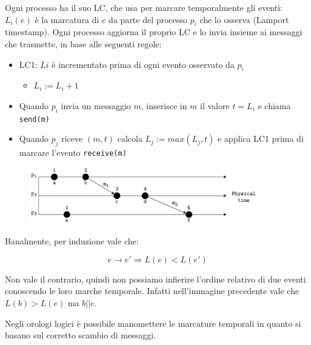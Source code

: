 Ogni processo ha il suo LC, che usa per marcare temporalmente gli eventi: $L_{i}(e)$ è la marcatura di $e$ da parte del processo $p_{i}$ che lo osserva (Lamport timestamp). Ogni processo aggiorna il proprio LC e lo invia insieme ai messaggi che trasmette, in base alle seguenti regole:
\begin{itemize}
    \item LC1: $L{i}$ è incrementato prima di ogni evento osservato da $p_{i}$
    \begin{itemize}
        \item $L_{i} := L_{i} + 1$
    \end{itemize}
    \item Quando $p_{i}$ invia un messaggio $m$, inserisce in $m$ il valore $t = L_{i}$ e chiama \texttt{send(m)}
    
    \item Quando $p_{j}$ riceve $(m,t)$ calcola $L_{j} := max(L_{j},t)$ e applica LC1 prima di marcare l'evento \texttt{receive(m)}
\end{itemize}

\begin{figure}[hbt!]
    \centering
    \includegraphics[width=10cm]{./Images/cap3/3.4.png}
\end{figure}

Banalmente, per induzione vale che:

\[ e \rightarrow e' \Rightarrow L(e) < L(e')\]

Non vale il contrario, quindi non possiamo infierire l'ordine relativo di due eventi conoscendo le loro marche temporale. Infatti nell'immagine precedente vale che $L(b) > L(e)$ ma $b || e$.

Negli orologi logici è possibile manomettere le marcature temporali in quanto si basano sul corretto scambio di messaggi.

